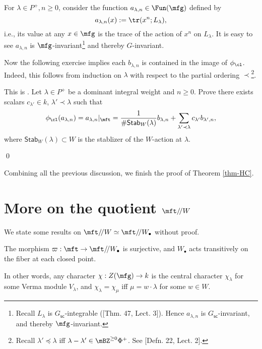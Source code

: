 		For $\lambda \in P^+, n\ge 0$, consider the function $a_{\lambda,n}\in \Fun(\mfg) $ defined by
		\[
			a_{\lambda,n}(x):=\tr(x^n; L_\lambda),
		\]
		i.e., its value at any $x\in \mfg$ is the trace of the action of $x^n$ on $L_\lambda$. It is easy to see $a_{\lambda,n}$ is $\mfg$-invariant\footnote{Recall $L_\lambda$ is $G_\mathsf{sc}$-integrable ([Thm. 47, Lect. 3]). Hence $a_{\lambda,n}$ is $G_\mathsf{sc}$-invariant, and thereby $\mfg$-invariant.
		} and thereby $G$-invariant. 

		Now the following exercise implies each $b_{\lambda,n}$ is contained in the image of $\phi_\cl$. Indeed, this follows from induction on $\lambda$ with respect to the partial ordering $\prec$\footnote{Recall $\lambda'\preceq\lambda$ iff $\lambda-\lambda' \in \mBZ^{\ge 0}\Phi^+$. See [Defn. 22, Lect. 2].}.

		\begin{exe}
			This is . Let $\lambda \in P^+$ be a dominant integral weight and $n\ge 0$. Prove there exists scalars $c_{\lambda'} \in k$, $\lambda' \prec \lambda$ such that
			\[
				\phi_\cl(a_{\lambda,n}) = a_{\lambda,n}|_{\mft} = \frac{1}{\#\mathsf{Stab}_W(\lambda)}b_{\lambda,n} + \sum_{\lambda' \prec \lambda} c_{\lambda'}b_{\lambda',n},
			\]
			where $\mathsf{Stab}_W(\lambda)\subset W$ is the stablizer of the $W$-action at $\lambda$.

		\end{exe}

	\qed

	Combining all the previous discussion, we finish the proof of Theorem \ref{thm-HC}.

\section{More on the quotient \texorpdfstring{$\mft/\!/W$}{t//W}}

	We state some results on $\mft/\!/W\simeq \mft/\!/W_\bullet$ without proof.

	\begin{prop}[{\!\!\cite[Sect. 1.10]{H2}}]
		The morphism $\varpi:\mft \to \mft/\!/W_\bullet$ is surjective, and $W_\bullet$ acts transitively on the fiber at each closed point.
	\end{prop}

	\begin{rem}
		In other words, any character $\chi:Z(\mfg) \to k$ is the central character $\chi_\lambda$ for some Verma module $V_\lambda$, and $\chi_\lambda =\chi_\mu$ iff $\mu=w\cdot \lambda$ for some $w\in W$.
	\end{rem}

